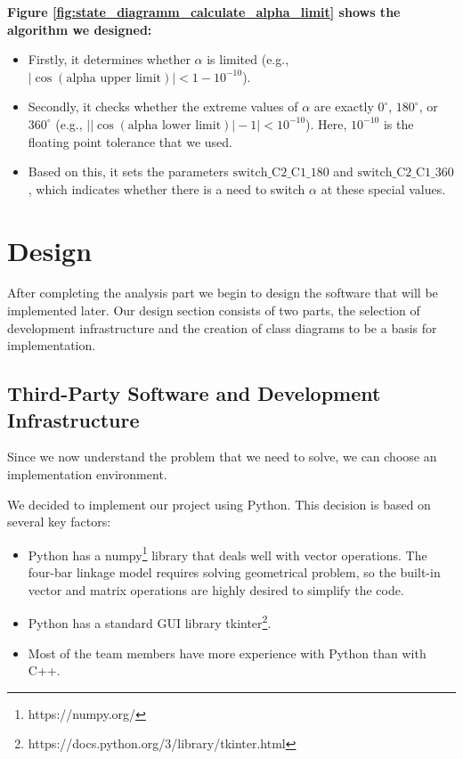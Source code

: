 \documentclass{article}
\begin{document}
\textbf{Figure \ref{fig:state_diagramm_calculate_alpha_limit} shows the algorithm we designed:}
\begin{itemize}
    \item Firstly, it determines whether \(\alpha\) is limited (e.g., \(|\cos(\text{alpha upper limit})| < 1 - 10^{-10}\)).
    \item Secondly, it checks whether the extreme values of \(\alpha\) are exactly \(0^\circ\), \(180^\circ\), or \(360^\circ\) (e.g., \(\bigl|\bigl| \cos(\text{alpha lower limit}) \bigr| - 1 \bigr| < 10^{-10}\)). Here, \(10^{-10}\) is the floating point tolerance that we used.
    \item Based on this, it sets the parameters \(\text{switch\_C2\_C1\_180}\) and \(\text{switch\_C2\_C1\_360}\), which indicates whether there is a need to switch \(\alpha\) at these special values.
\end{itemize}



\section{Design} \label{ch:design}

After completing the analysis part we begin to design the software that will be implemented later. Our design section consists of two parts, the selection of development infrastructure and the creation of class diagrams to be a basis for implementation.

\subsection{Third-Party Software and Development Infrastructure}

Since we now understand the problem that we need to solve, we can choose an implementation environment.

We decided to implement our project using Python. This decision is based on several key factors:
\begin{itemize}
	\item Python has a numpy\footnote{\label{fn:numpy} https://numpy.org/} library that deals well with vector operations. The four-bar linkage model requires solving geometrical problem, so the built-in vector and matrix operations are highly desired to simplify the code.
	\item Python has a standard GUI library tkinter\footnote{\label{fn:tkinter} https://docs.python.org/3/library/tkinter.html}.
	\item Most of the team members have more experience with Python than with C++.
\end{itemize}
\end{document}
